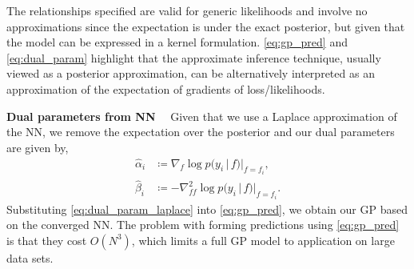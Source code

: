 \documentclass{article}
\renewcommand{\paragraph}[1]{{\bf #1}~~}
\renewcommand{\mid}{\,|\,}
\begin{document}
%
The relationships specified are valid for generic likelihoods and involve no approximations since the expectation is under the exact posterior, but given that the model can be expressed in a kernel formulation. \cref{eq:gp_pred} and \cref{eq:dual_param} highlight that the approximate inference technique, usually viewed as a posterior approximation, can be alternatively interpreted as an approximation of the expectation of gradients of loss/likelihoods.


\paragraph{Dual parameters from NN}
Given that we use a Laplace approximation of the NN, we remove the expectation over the posterior \citep[see Ch.~3.4.1 in][for derivation]{rasmussen2006gaussian} and our dual parameters are given by,
%
\begin{equation}
\begin{split}
  \label{eq:dual_param_laplace}
  \hat{\alpha}_i &\coloneqq \nabla_{f}\log p(y_i \mid f) |_{f=f_i} , \\
  \hat{\beta}_i &\coloneqq - \nabla^2_{ff}\log p(y_i \mid f) |_{f=f_i}.
  \end{split}
\end{equation}
%
Substituting \cref{eq:dual_param_laplace} into \cref{eq:gp_pred}, we obtain our GP based on the converged NN. The problem with forming predictions using \cref{eq:gp_pred} is that they cost $O(N^3)$, which limits a full GP model to application on large data sets.
\end{document}
